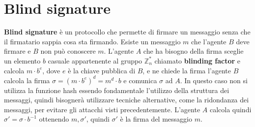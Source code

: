 \section{Blind signature}
\textbf{Blind signature} è un protocollo che permette di firmare un messaggio senza che il firmatario 
sappia cosa sta firmando. Esiste un messaggio $m$ che l'agente $B$ deve firmare e $B$ non può 
conoscere $m$. L'agente $A$ che ha bisogno della firma sceglie un elemento $b$ casuale appartenente 
al gruppo $\mathbb{Z}_n^*$ chiamato \textbf{blinding factor} e calcola $m \cdot b^e$, dove 
$e$ è la chiave pubblica di $B$, e ne chiede 
la firma l'agente $B$ calcola la firma $\sigma = (m \cdot b^e)^d = m^d \cdot b$ e 
comunica $\sigma$ ad $A$. In questo caso 
non si utilizza la funzione hash essendo fondamentale l'utilizzo della struttura dei messaggi,
quindi bisognerà utilizzare tecniche alternative, come la ridondanza 
dei messaggi, per evitare gli attacchi visti precedentemente.
L'agente $A$ calcola quindi $\sigma' = \sigma \cdot b^{-1}$ ottenendo $m, \sigma'$, quindi
$\sigma'$ è la firma del messaggio $m$.

